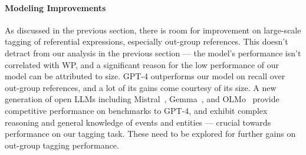 \paragraph{Modeling Improvements} As discussed in the previous section, there is room for improvement on large-scale tagging of referential expressions, especially out-group references. This doesn't detract from our analysis in the previous section --- the model's performance isn't correlated with WP, and a significant reason for the low performance of our model can be attributed to size. GPT-4 outperforms our model on recall over out-group references, and a lot of its gains come courtesy of its size. A new generation of open LLMs including Mistral~\citep{jiang2023mistral}, Gemma~\cite{geminiteam2023gemini}, and OLMo~\citep{Groeneveld2023OLMo} provide competitive performance on benchmarks to GPT-4, and exhibit complex reasoning and general knowledge of events and entities --- crucial towards performance on our tagging task. These need to be explored for further gains on out-group tagging performance.
